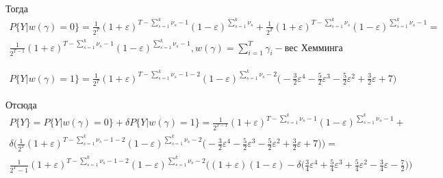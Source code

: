 \documentclass[a4paper,12pt]{article}
\theoremstyle{plain}
\begin{document}
    Тогда 
    \begin{gather*}
    P\{Y|w(\gamma)=0\}=\frac{1}{2^T}(1+\varepsilon)^{T-\sum\limits_{s=1}^{k}\nu_s-1} (1-\varepsilon)^{\sum\limits_{s=1}^{k}\nu_s}+\frac{1}{2^T}(1+\varepsilon)^{T-\sum\limits_{s=1}^{k}\nu_s} (1-\varepsilon)^{\sum\limits_{s=1}^{k}\nu_s-1}=\\ \frac{1}{2^{T-1}}(1+\varepsilon)^{T-\sum\limits_{s=1}^{k}\nu_s-1} (1-\varepsilon)^{\sum\limits_{s=1}^{k}\nu_s-1}, w(\gamma)=\sum\limits_{i=1}^{T}\gamma_i - \text{вес Хемминга}
    \end{gather*}
    
    \begin{gather*}
    P\{Y|w(\gamma)=1\}=\frac{1}{2^T}(1+\varepsilon)^{T-\sum\limits_{s=1}^{k}\nu_s-1-2} (1-\varepsilon)^{\sum\limits_{s=1}^{k}\nu_s-2}\bigl(-\frac{3}{2}\varepsilon^4-\frac{5}{2}\varepsilon^3-\frac{5}{2}\varepsilon^2+\frac{3}{2}\varepsilon + 7\bigl)
    \end{gather*}
    
    Отсюда 
    \begin{gather*}
    P\{Y\}=P\{Y|w(\gamma)=0\} + \delta P\{Y|w(\gamma)=1\}= \frac{1}{2^{T-1}}(1+\varepsilon)^{T-\sum\limits_{s=1}^{k}\nu_s-1} (1-\varepsilon)^{\sum\limits_{s=1}^{k}\nu_s-1} +\\ \delta \biggl( \frac{1}{2^T}(1+\varepsilon)^{T-\sum\limits_{s=1}^{k}\nu_s-1-2} (1-\varepsilon)^{\sum\limits_{s=1}^{k}\nu_s-2}\bigl(-\frac{3}{2}\varepsilon^4-\frac{5}{2}\varepsilon^3-\frac{5}{2}\varepsilon^2+\frac{3}{2}\varepsilon + 7\bigl) \biggl) = \\
    \frac{1}{2^T-1}(1+\varepsilon)^{T-\sum\limits_{s=1}^{k}\nu_s-1-2} (1-\varepsilon)^{\sum\limits_{s=1}^{k}\nu_s-2}\biggl((1+\varepsilon)(1-\varepsilon)-\delta\bigl(\frac{3}{4}\varepsilon^4+\frac{5}{4}\varepsilon^3+\frac{5}{4}\varepsilon^2-\frac{3}{4}\varepsilon - \frac{7}{2}\bigl)\biggl)
    \end{gather*}
    
    
    
    
  


 
\end{document}
